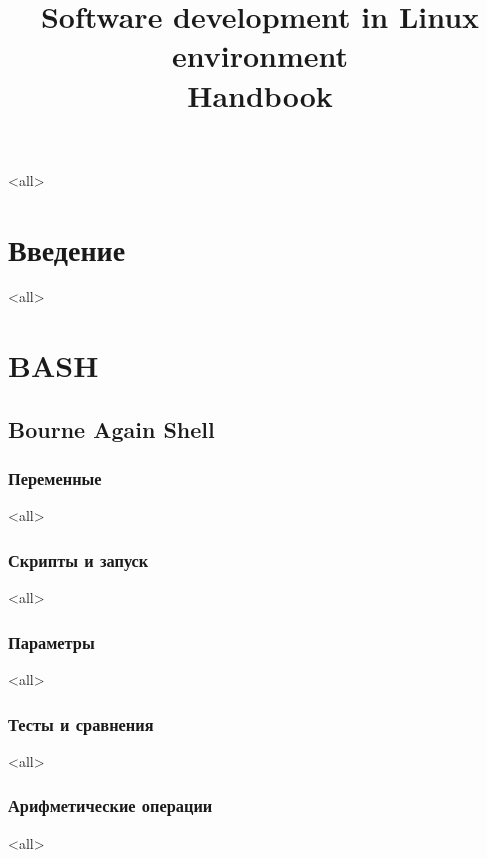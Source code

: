 

\title{Software development in Linux environment\\Handbook}

\mode<all>{}


\maketitle

\tableofcontents


\part{Введение}

\mode<all>{}


\part{BASH}
\chapter*{Bourne Again Shell}
\section{Переменные}
\mode<all>{}
\section{Скрипты и запуск}
\mode<all>{}
\section{Параметры}
\mode<all>{}
\section{Тесты и сравнения}
\mode<all>{}
\section{Арифметические операции}
\mode<all>{}
